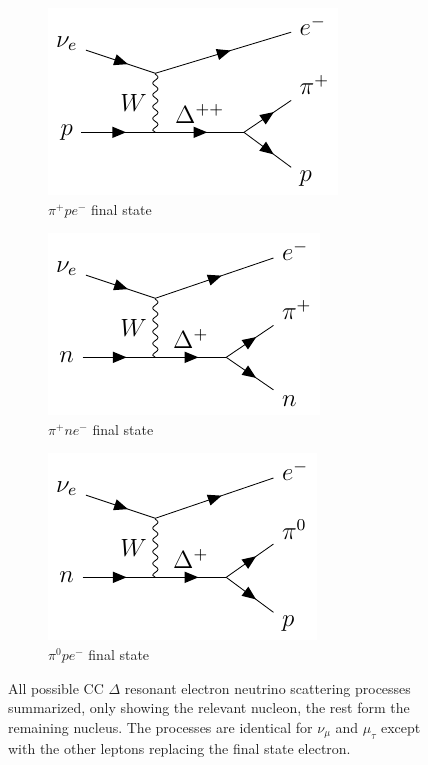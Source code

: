 \documentclass[a4paper,12pt]{article}
\begin{document}
\begin{figure}[H]
    \centering
    \begin{subfigure}[b]{0.3\textwidth}
        \centering
        \includegraphics{figures/fds/RESneu1.pdf}
        \caption{
            $\pi^+pe^-$ final state
        }
    \end{subfigure}
    \begin{subfigure}[b]{0.3\textwidth}
        \centering
        \includegraphics{figures/fds/RESneu2.pdf}
        \caption{
            $\pi^+ne^-$ final state
        }
    \end{subfigure}
    \begin{subfigure}[b]{0.3\textwidth}
        \centering
        \includegraphics{figures/fds/RESneu3.pdf}
        \caption{
            $\pi^0pe^-$ final state
        }
    \end{subfigure}
    \caption{
        All possible CC $\Delta$ resonant electron neutrino scattering processes summarized, only showing the relevant nucleon, the rest form the remaining nucleus.
        The processes are identical for $\nu_\mu$ and $\mu_\tau$ except with the other leptons replacing the final state electron.
    }\label{fig:RES_fd}
\end{figure}
\end{document}
